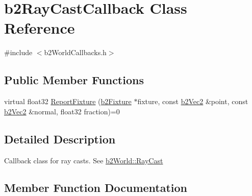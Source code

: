 \hypertarget{classb2_ray_cast_callback}{}\section{b2\+Ray\+Cast\+Callback Class Reference}
\label{classb2_ray_cast_callback}


{\ttfamily \#include $<$b2\+World\+Callbacks.\+h$>$}

\subsection*{Public Member Functions}
\begin{DoxyCompactItemize}
\item 
virtual float32 \hyperlink{classb2_ray_cast_callback_a658d5c8e89e0c73230cc8bddade4f3a4}{Report\+Fixture} (\hyperlink{classb2_fixture}{b2\+Fixture} $\ast$fixture, const \hyperlink{structb2_vec2}{b2\+Vec2} \&point, const \hyperlink{structb2_vec2}{b2\+Vec2} \&normal, float32 fraction)=0
\end{DoxyCompactItemize}


\subsection{Detailed Description}
Callback class for ray casts. See \hyperlink{classb2_world_ad902548be84df9cc36eced0f4c89ab0a}{b2\+World\+::\+Ray\+Cast} 

\subsection{Member Function Documentation}
